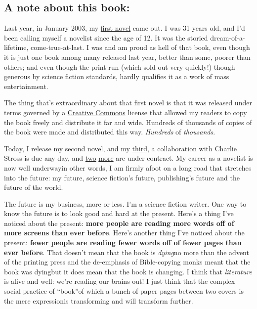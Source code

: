 \subsection{A note about this book:}

Last year, in January 2003, my
\href{http://craphound.com/down}{first novel} came out. I was 31
years old, and I’d been calling myself a novelist since the age of
12. It was the storied dream-of-a-lifetime, come-true-at-last. I
was and am proud as hell of that book, even though it is just one
book among many released last year, better than some, poorer than
others; and even though the print-run (which sold out very
quickly!) though generous by science fiction standards, hardly
qualifies it as a work of mass entertainment.

The thing that’s extraordinary about that first novel is that it
was released under terms governed by a
\href{http://creativecommons.org/}{Creative Commons} license that
allowed my readers to copy the book freely and distribute it far
and wide. Hundreds of thousands of copies of the book were made and
distributed this way. \emph{Hundreds} of \emph{thousands}.

Today, I release my second novel, and my
\href{http://www.argosymag.com/NextIssue.html}{third}, a
collaboration with Charlie Stross is due any day, and
\href{http://www.fantasticmetropolis.com/show.html?fn.preview\_doctorow}{two}
\href{http://www.craphound.com/usrbingodexcerpt.txt}{more} are
under contract. My career as a novelist is now well underway{\dash}in
other words, I am firmly afoot on a long road that stretches into
the future: my future, science fiction’s future, publishing’s
future and the future of the world.

The future is my business, more or less. I’m a science fiction
writer. One way to know the future is to look good and hard at the
present. Here’s a thing I’ve noticed about the present:
\textbf{more people are reading more words off of more screens than ever before}.
Here’s another thing I’ve noticed about the present:
\textbf{fewer people are reading fewer words off of fewer pages than ever before}.
That doesn’t mean that the book is \emph{dying}{\dash}no more than the
advent of the printing press and the de-emphasis of Bible-copying
monks meant that the book was dying{\dash}but it does mean that the book
is changing. I think that \emph{literature} is alive and well:
we’re reading our brains out! I just think that the complex social
practice of “book”{\dash}of which a bunch of paper pages between two
covers is the mere expression{\dash}is transforming and will transform
further.

